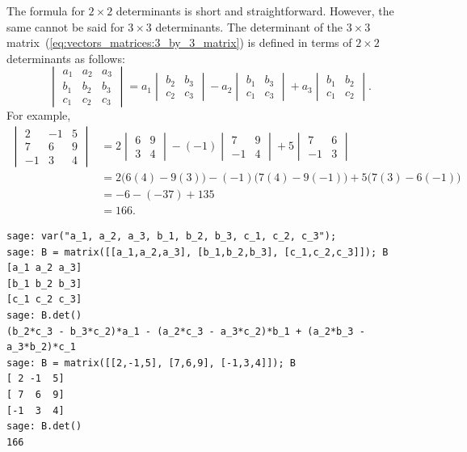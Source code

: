 The formula for $2 \times 2$ determinants is short and
straightforward. However, the same cannot be said for $3 \times 3$
determinants. The determinant of the $3 \times 3$
matrix~(\ref{eq:vectors_matrices:3_by_3_matrix}) is defined in terms
of $2 \times 2$
determinants as follows:
%
\begin{equation}
\label{eq:vectors_matrices:3_by_3_determinant}
\begin{vmatrix}
a_1 & a_2 & a_3 \\
b_1 & b_2 & b_3 \\
c_1 & c_2 & c_3
\end{vmatrix}
=
a_1
\begin{vmatrix}
b_2 & b_3 \\
c_2 & c_3
\end{vmatrix}
-
a_2
\begin{vmatrix}
b_1 & b_3 \\
c_1 & c_3
\end{vmatrix}
+
a_3
\begin{vmatrix}
b_1 & b_2 \\
c_1 & c_2
\end{vmatrix}.
\end{equation}
%
For example,
%
\begin{align*}
\begin{vmatrix}
2  & -1 & 5 \\
7  & 6  & 9 \\
-1 & 3  & 4
\end{vmatrix}
&=
2
\begin{vmatrix}
6 & 9 \\
3 & 4
\end{vmatrix}
-
(-1)
\begin{vmatrix}
7  & 9 \\
-1 & 4
\end{vmatrix}
+
5
\begin{vmatrix}
7  & 6 \\
-1 & 3
\end{vmatrix} \\
&= 2 \big( 6(4) - 9(3) \big)
 - (-1) \big( 7(4) - 9(-1) \big)
 + 5 \big( 7(3) - 6(-1) \big) \\
&=
-6 - (-37) + 135 \\
&=
166.
\end{align*}

\begin{lstlisting}
sage: var("a_1, a_2, a_3, b_1, b_2, b_3, c_1, c_2, c_3");
sage: B = matrix([[a_1,a_2,a_3], [b_1,b_2,b_3], [c_1,c_2,c_3]]); B
[a_1 a_2 a_3]
[b_1 b_2 b_3]
[c_1 c_2 c_3]
sage: B.det()
(b_2*c_3 - b_3*c_2)*a_1 - (a_2*c_3 - a_3*c_2)*b_1 + (a_2*b_3 - a_3*b_2)*c_1
sage: B = matrix([[2,-1,5], [7,6,9], [-1,3,4]]); B
[ 2 -1  5]
[ 7  6  9]
[-1  3  4]
sage: B.det()
166
\end{lstlisting}


